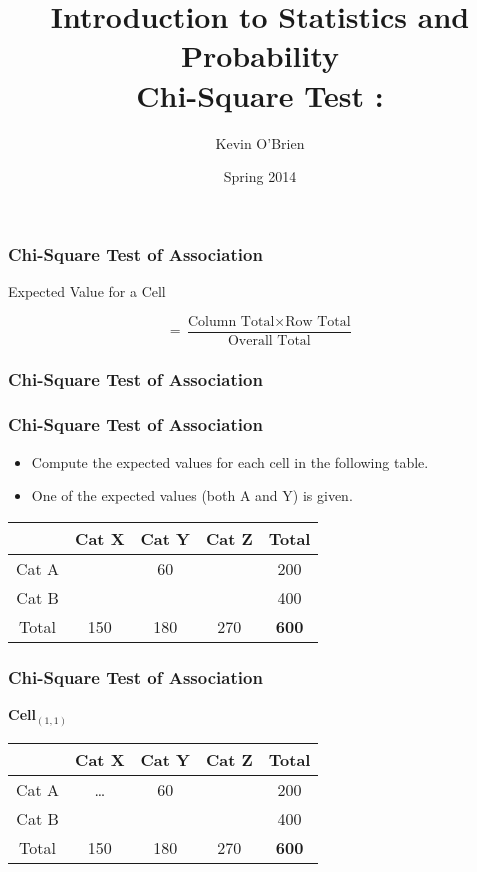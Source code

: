 \documentclass[a4]{beamer}
\title[Stats-Lab.com]{\LARGE Introduction to Statistics and Probability \\ {\Large Chi-Square Test : }}
\author[Kevin O'Brien]{Kevin O'Brien}
\date{Spring 2014}
\begin{document}
\begin{frame}
\titlepage
\end{frame}


\begin{frame}
\frametitle{Chi-Square Test of Association}

\Large
Expected Value for a Cell

\[ = \frac{\mbox{Column Total}  \times \mbox{Row Total} } {\mbox{Overall Total}}  \]

\end{frame}

\begin{frame}
\frametitle{Chi-Square Test of Association}

\Large




\end{frame}
\begin{frame}
\frametitle{Chi-Square Test of Association}

\Large
\begin{itemize}
\item Compute the expected values for each cell in the following table.
\item One of the expected values (both A and Y) is given.
\end{itemize}
\begin{center}
\Large
\begin{tabular}{|c|c|c|c|c|}
\hline
 & Cat X & Cat Y & Cat Z & Total  \\ \hline
Cat A & & 60 &  & 200\\ \hline
Cat B & &  &  & 400 \\ \hline
Total & 150 & 180 & 270 &  \textbf{600}\\ \hline
\end{tabular} 
\end{center}

\end{frame}
\begin{frame}
\frametitle{Chi-Square Test of Association}

\Large
\textbf{Cell$_{(1,1)}$}
\begin{center}
\begin{tabular}{|c|c|c|c|c|}
\hline & Cat X & Cat Y & Cat Z & Total  \\ \hline
Cat A & \alert{\ldots}& 60 &  & 200\\ \hline
Cat B & \phantom{space}& \phantom{space} & \phantom{space} & 400 \\ \hline
Total & 150 & 180 & 270 &  \textbf{600}\\ \hline

\end{tabular} 
\end{center}

\end{frame}
\end{document}
